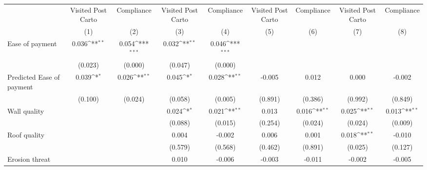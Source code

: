 {
\def\sym#1{\ifmmode^{#1}\else\(^{#1}\)\fi}
\begin{tabular}{l*{8}{c}}
\toprule
                &\multicolumn{1}{c}{Visited Post Carto}&\multicolumn{1}{c}{Compliance}&\multicolumn{1}{c}{Visited Post Carto}&\multicolumn{1}{c}{Compliance}&\multicolumn{1}{c}{Visited Post Carto}&\multicolumn{1}{c}{Compliance}&\multicolumn{1}{c}{Visited Post Carto}&\multicolumn{1}{c}{Compliance}\\
                &\multicolumn{1}{c}{(1)}         &\multicolumn{1}{c}{(2)}         &\multicolumn{1}{c}{(3)}         &\multicolumn{1}{c}{(4)}         &\multicolumn{1}{c}{(5)}         &\multicolumn{1}{c}{(6)}         &\multicolumn{1}{c}{(7)}         &\multicolumn{1}{c}{(8)}         \\
\midrule
Ease of payment &    0.036\sym{**} &    0.054\sym{***}&    0.032\sym{**} &    0.046\sym{***}&                  &                  &                  &                  \\
                &  (0.023)         &  (0.000)         &  (0.047)         &  (0.000)         &                  &                  &                  &                  \\
Predicted Ease of payment&    0.039\sym{*}  &    0.026\sym{**} &    0.045\sym{*}  &    0.028\sym{**} &   -0.005         &    0.012         &    0.000         &   -0.002         \\
                &  (0.100)         &  (0.024)         &  (0.058)         &  (0.005)         &  (0.891)         &  (0.386)         &  (0.992)         &  (0.849)         \\
Wall quality    &                  &                  &    0.024\sym{*}  &    0.021\sym{**} &    0.013         &    0.016\sym{**} &    0.025\sym{**} &    0.013\sym{**} \\
                &                  &                  &  (0.088)         &  (0.015)         &  (0.254)         &  (0.024)         &  (0.024)         &  (0.009)         \\
Roof quality    &                  &                  &    0.004         &   -0.002         &    0.006         &    0.001         &    0.018\sym{**} &   -0.010         \\
                &                  &                  &  (0.579)         &  (0.568)         &  (0.462)         &  (0.891)         &  (0.025)         &  (0.127)         \\
Erosion threat  &                  &                  &    0.010         &   -0.006         &   -0.003         &   -0.011         &   -0.002         &   -0.005         \\

\end{tabular}}
